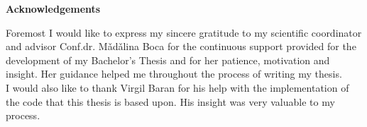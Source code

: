 \thispagestyle{plain} 


\vspace*{36pt}

\begin{center}

{\LARGE \textbf{Acknowledgements}}

\end{center}

\vspace{36pt}
Foremost I would like to express my sincere gratitude to my scientific coordinator and advisor Conf.dr. M\v ad\v alina Boca for the continuous support provided for the development of my Bachelor's Thesis and for her patience, motivation and insight. Her guidance helped me throughout the process of writing my thesis. \\

I would also like to thank Virgil Baran for his help with the implementation of the code that this thesis is based upon. His insight was very valuable to my process.
\vspace{40pt}



\vspace*{\fill}